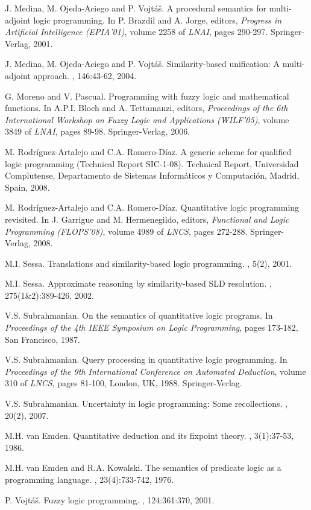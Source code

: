 \documentclass{sigplanconf}
\theoremstyle{definition}
\theoremstyle{plain}
\begin{document}
\begin{thebibliography}{22}
J. Medina, M. Ojeda-Aciego and P. Vojt\'a\v{s}.
\newblock A procedural semantics for multi-adjoint logic programming.
\newblock In P. Brazdil and A. Jorge, editors, {\em Progress in Artificial Intelligence (EPIA'01)}, volume 2258 of {\em LNAI}, pages 290-297. Springer-Verlag, 2001.

J. Medina, M. Ojeda-Aciego and P. Vojt\'a\v{s}.
\newblock Similarity-based unification: A multi-adjoint approach.
, 146:43-62, 2004.

G. Moreno and V. Pascual.
\newblock Programming with fuzzy logic and mathematical functions. In A.P.I. Bloch and A. Tettamanzi, editors, {\em Proceedings of the 6th International Workshop on Fuzzy Logic and Applications (WILF'05)}, volume 3849 of {\em LNAI}, pages 89-98. Springer-Verlag, 2006.

M. Rodr\'iguez-Artalejo and C.A. Romero-D\'iaz.
\newblock A generic scheme for qualified logic programming (Technical Report SIC-1-08).
\newblock Technical Report, Universidad Complutense, Departamento de Sistemas Inform\'aticos y Computaci\'on, Madrid, Spain, 2008.

M. Rodr\'iguez-Artalejo and C.A. Romero-D\'iaz.
\newblock Quantitative logic programming revisited.
\newblock In J. Garrigue and M. Hermenegildo, editors, {\em Functional and Logic Programming (FLOPS'08)}, volume 4989 of {\em LNCS}, pages 272-288. Springer-Verlag, 2008.

M.I. Sessa.
\newblock Translations and similarity-based logic programming.
, 5(2), 2001.

M.I. Sessa.
\newblock Approximate reasoning by similarity-based SLD resolution.
, 275(1\&2):389-426, 2002.

V.S. Subrahmanian.
\newblock On the semantics of quantitative logic programs.
\newblock In {\em Proceedings of the 4th IEEE Symposium on Logic Programming}, pages 173-182, San Francisco, 1987.

V.S. Subrahmanian.
\newblock Query processing in quantitative logic programming.
\newblock In {\em Proceedings of the 9th International Conference on Automated Deduction}, volume 310 of {\em LNCS}, pages 81-100, London, UK, 1988. Springer-Verlag.

V.S. Subrahmanian.
\newblock Uncertainty in logic programming: Some recollections.
, 20(2), 2007.

M.H. van Emden.
\newblock Quantitative deduction and its fixpoint theory.
, 3(1):37-53, 1986.

M.H. van Emden and R.A. Kowalski.
\newblock The semantics of predicate logic as a programming language.
, 23(4):733-742, 1976.

P. Vojt\'a\v{s}.
\newblock Fuzzy logic programming.
, 124:361:370, 2001.
\end{thebibliography}
\end{document}
